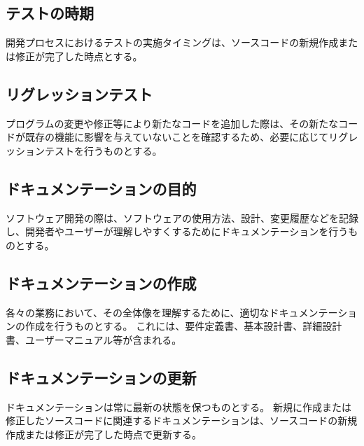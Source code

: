 \subsection{テストの時期}
開発プロセスにおけるテストの実施タイミングは、ソースコードの新規作成または修正が完了した時点とする。

\subsection{リグレッションテスト}
プログラムの変更や修正等により新たなコードを追加した際は、その新たなコードが既存の機能に影響を与えていないことを確認するため、必要に応じてリグレッションテストを行うものとする。


\clearpage

\subsection{ドキュメンテーションの目的}
ソフトウェア開発の際は、ソフトウェアの使用方法、設計、変更履歴などを記録し、開発者やユーザーが理解しやすくするためにドキュメンテーションを行うものとする。

\subsection{ドキュメンテーションの作成}
各々の業務において、その全体像を理解するために、適切なドキュメンテーションの作成を行うものとする。
これには、要件定義書、基本設計書、詳細設計書、ユーザーマニュアル等が含まれる。

\subsection{ドキュメンテーションの更新}
ドキュメンテーションは常に最新の状態を保つものとする。
新規に作成または修正したソースコードに関連するドキュメンテーションは、ソースコードの新規作成または修正が完了した時点で更新する。

